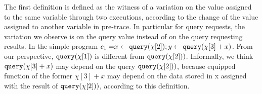 {   
 The first definition is defined as
 the witness of a variation on the value assigned to the same variable through two executions,
 according to the change of the value assigned to another variable in pre-trace.
 In particular for query requests, the variation we observe is on the query value instead of on the query requesting results.
 In 
 the simple program $c_1 =\mathrel{ x \leftarrow {\tt query}(\chi[2]) } ;\mathrel{ y \leftarrow {\tt query}(\chi[3] + x) }$.
 From our perspective, ${\tt query}(\chi[1])$ is different from ${\tt query}(\chi[2]))$. Informally, we think ${\tt query}(\chi[3] + x)$ may depend on the query ${\tt query}(\chi[2]))$, because equipped function of the former $\chi[3] + x$ may depend on the data stored in x assigned with the result of ${\tt query}(\chi[2]))$, according to this definition. }
 

